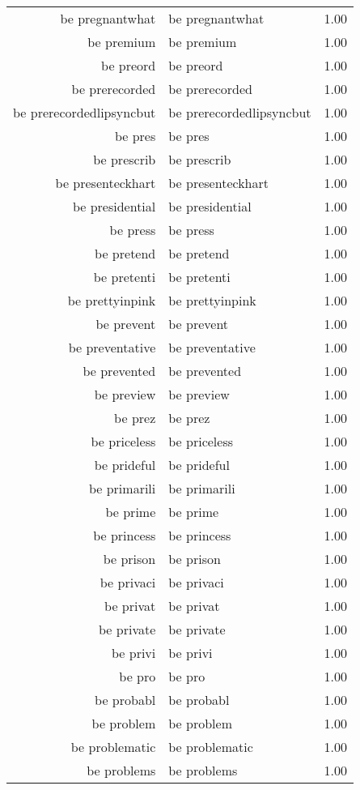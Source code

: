 \begin{table}[ht]
\begin{tabular}{rlr}
  be pregnantwhat & be pregnantwhat & 1.00 \\ 
  be premium & be premium & 1.00 \\ 
  be preord & be preord & 1.00 \\ 
  be prerecorded & be prerecorded & 1.00 \\ 
  be prerecordedlipsyncbut & be prerecordedlipsyncbut & 1.00 \\ 
  be pres & be pres & 1.00 \\ 
  be prescrib & be prescrib & 1.00 \\ 
  be presenteckhart & be presenteckhart & 1.00 \\ 
  be presidential & be presidential & 1.00 \\ 
  be press & be press & 1.00 \\ 
  be pretend & be pretend & 1.00 \\ 
  be pretenti & be pretenti & 1.00 \\ 
  be prettyinpink & be prettyinpink & 1.00 \\ 
  be prevent & be prevent & 1.00 \\ 
  be preventative & be preventative & 1.00 \\ 
  be prevented & be prevented & 1.00 \\ 
  be preview & be preview & 1.00 \\ 
  be prez & be prez & 1.00 \\ 
  be priceless & be priceless & 1.00 \\ 
  be prideful & be prideful & 1.00 \\ 
  be primarili & be primarili & 1.00 \\ 
  be prime & be prime & 1.00 \\ 
  be princess & be princess & 1.00 \\ 
  be prison & be prison & 1.00 \\ 
  be privaci & be privaci & 1.00 \\ 
  be privat & be privat & 1.00 \\ 
  be private & be private & 1.00 \\ 
  be privi & be privi & 1.00 \\ 
  be pro & be pro & 1.00 \\ 
  be probabl & be probabl & 1.00 \\ 
  be problem & be problem & 1.00 \\ 
  be problematic & be problematic & 1.00 \\ 
  be problems & be problems & 1.00 \\ 

\end{tabular}
\end{table}
